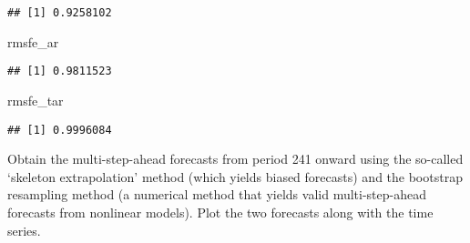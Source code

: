 \documentclass[
  oneside]{book}
\newenvironment{Shaded}{\begin{snugshade}}{\end{snugshade}}
\newcommand{\NormalTok}[1]{#1}
\begin{document}
\begin{verbatim}
## [1] 0.9258102
\end{verbatim}

\begin{Shaded}
\begin{Highlighting}[]
\NormalTok{rmsfe\_ar}
\end{Highlighting}
\end{Shaded}

\begin{verbatim}
## [1] 0.9811523
\end{verbatim}

\begin{Shaded}
\begin{Highlighting}[]
\NormalTok{rmsfe\_tar}
\end{Highlighting}
\end{Shaded}

\begin{verbatim}
## [1] 0.9996084
\end{verbatim}

Obtain the multi-step-ahead forecasts from period 241 onward using the so-called `skeleton extrapolation' method (which yields biased forecasts) and the bootstrap resampling method (a numerical method that yields valid multi-step-ahead forecasts from nonlinear models). Plot the two forecasts along with the time series.
\end{document}
